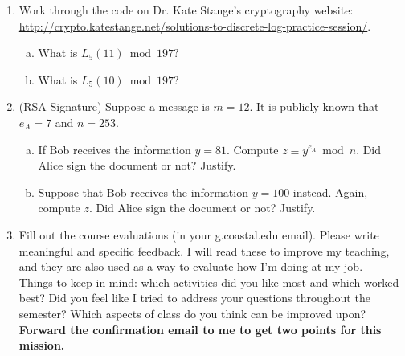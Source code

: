 \documentclass[12pt]{amsart}
\theoremstyle{plain}
\theoremstyle{definition}
\begin{document}
\begin{enumerate}[1.]
	\item Work through the code on Dr. Kate Stange's cryptography website: \url{http://crypto.katestange.net/solutions-to-discrete-log-practice-session/}.  
		\begin{enumerate}[a.]
			\item What is $L_5(11) \bmod 197$?
			\begin{framed}
			\vspace{.5in}
			\end{framed}
			\item What is $L_5(10) \bmod 197$?
			\begin{framed}
			\vspace{.5in}
			\end{framed}
		\end{enumerate}
	\item (RSA Signature) Suppose a message is $m = 12$.  It is publicly known that $e_A = 7$ and $n = 253$.
			\begin{enumerate}[a.]
			\item If Bob receives the information $y = 81$.  Compute $z \equiv y^{e_A} \bmod n$.  Did Alice sign the document or not?  Justify.
			\begin{framed}
			\vspace{1.5in}
			\end{framed}
			\newpage \item Suppose that Bob receives the information $y = 100$ instead.  Again, compute $z$.  Did Alice sign the document or not?  Justify.
			\begin{framed}
			\vspace{1.5in}
			\end{framed}
		\end{enumerate}
	\item Fill out the course evaluations (in your g.coastal.edu email). Please write meaningful and specific feedback.  I will read these to improve my teaching, and they are also used as a way to evaluate how I'm doing at my job.\\
	Things to keep in mind: which activities did you like most and which worked best?  Did you feel like I tried to address your questions throughout the semester?  Which aspects of class do you think can be improved upon?  \textbf{Forward the confirmation email to me to get two points for this mission.}\\
	

\end{enumerate}
\end{document}
